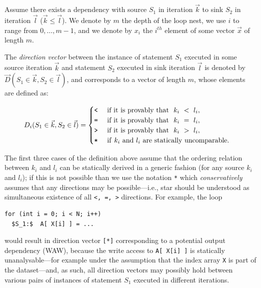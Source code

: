 \begin{definition}\label{Dep-Dir-Vect}

  Assume there exists a dependency with source $S_{1}$ in iteration $\vec{k}$
  to sink $S_{2}$ in iteration $\vec{l}$ ($\vec{k}\leq\vec{l}$).
  We denote by $m$ the depth of the loop nest, we use $i$ to range
  from $0,\ldots,m-1$, and we denote by $x_i$ the $i^{th}$
  element of some vector $\vec{x}$ of length $m$.

  The \emph{direction vector} between the instance of statement $S_1$
  executed in some source iteration $\vec{k}$ and statement $S_2$
  executed in sink iteration $\vec{l}$ is denoted by
  $\vec{D}(S_1\in\vec{k},S_{2}\in\vec{l})$, and corresponds to a vector
  of length $m$, whose elements are defined as:

  \begin{equation}
    D_i(S_1\in\vec{k},S_2\in\vec{l})=
    \begin{cases}
      \mbox{\texttt{<}} \ \ \ \ \mbox{\textrm{if it is provably that}} ~~k_i ~<~ l_i,\\
      \mbox{\texttt{=}} \ \ \ \ \mbox{\textrm{if it is provably that}} ~~k_i ~=~ l_i,\\
      \mbox{\texttt{>}} \ \ \ \ \mbox{\textrm{if it is provably that}} ~~k_i ~>~ l_i,\\
      \mbox{\texttt{{}*}} \ \ \ \ \mbox{\textrm{if}}~k_i ~\mbox{\textrm{{}and}}~ l_i~\mbox{are statically uncomparable.}\\
    \end{cases}
    \label{eqn:dir-vec}
 \end{equation}
\end{definition}

The first three cases of the definition above assume that the ordering
relation between $k_i$ and $l_i$ can be statically derived in a generic
fashion (for any source $k_i$ and $l_i$); if this is not possible than
we use the notation \texttt{*} which \emph{conservatively} assumes that any
directions may be possible---i.e., star should be understood as
simultaneous existence of all \texttt{<, =, >} directions. For example,
the loop
\begin{lstlisting}[mathescape=true]
for (int i = 0; i < N; i++)
  $S_1:$  A[ X[i] ] = ...
\end{lstlisting}
would result in direction vector \texttt{[*]} corresponding to a
potential output dependency (WAW), because the write access to
\texttt{A[ X[i] ]} is statically unanalysable---for example under the
assumption that the index array \texttt{X} is part of the
dataset---and, as such, all direction vectors may possibly hold
between various pairs of instances of statement $S_1$ executed in
different iterations.

